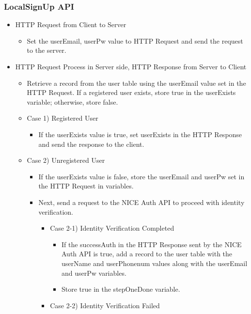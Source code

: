 \documentclass[conference]{IEEEtran}
\begin{document}
\subsubsection{LocalSignUp API}
\begin{itemize}
    \item HTTP Request from Client to Server 
    \begin{itemize}
        \item Set the userEmail, userPw value to HTTP Request and send the request to the server.
        \\
    \end{itemize}
    \item HTTP Request Process in Server side, HTTP Response from Server to Client 
    \begin{itemize}
        \item Retrieve a record from the user table using the userEmail value set in the HTTP Request. If a registered user exists, store true in the userExists variable; otherwise, store false.
        \item Case 1) Registered User
        \begin{itemize}
            \item If the userExists value is true, set userExists in the HTTP Response and send the response to the client.
        \end{itemize}
        \item Case 2) Unregistered User
        \begin{itemize}
            \item If the userExists value is false, store the userEmail and userPw set in the HTTP Request in variables.
            \item Next, send a request to the NICE Auth API to proceed with identity verification.
            \begin{itemize}
                \item Case 2-1) Identity Verification Completed
                \begin{itemize}
                    \item If the successAuth in the HTTP Response sent by the NICE Auth API is true, add a record to the user table with the userName and userPhonenum values along with the userEmail and userPw variables.
                    \item Store true in the stepOneDone variable.
                \end{itemize}
                \item Case 2-2) Identity Verification Failed

\end{itemize}
\end{itemize}
\end{itemize}
\end{itemize}
\end{document}
